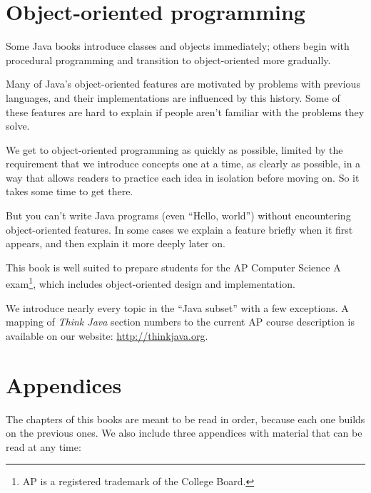\documentclass[12pt]{book}
\theoremstyle{exercise}
\begin{document}
\section*{Object-oriented programming}

Some Java books introduce classes and objects immediately; others begin with procedural programming and transition to object-oriented more gradually.

Many of Java's object-oriented features are motivated by problems with previous languages, and their implementations are influenced by this history.
Some of these features are hard to explain if people aren't familiar with the problems they solve.

We get to object-oriented programming as quickly as possible, limited by the requirement that we introduce concepts one at a time, as clearly as possible, in a way that allows readers to practice each idea in isolation before moving on.
So it takes some time to get there.

But you can't write Java programs (even ``Hello, world'') without encountering object-oriented features.
In some cases we explain a feature briefly when it first appears, and then explain it more deeply later on.

This book is well suited to prepare students for the AP Computer Science A exam\footnote{AP is a registered trademark of the College Board.}, which includes object-oriented design and implementation.

We introduce nearly every topic in the ``Java subset'' with a few exceptions.
A mapping of {\em Think Java} section numbers to the current AP course description is available on our website: \url{http://thinkjava.org}.



\section*{Appendices}

The chapters of this books are meant to be read in order, because each one builds on the previous ones.
We also include three appendices with material that can be read at any time:
\end{document}
